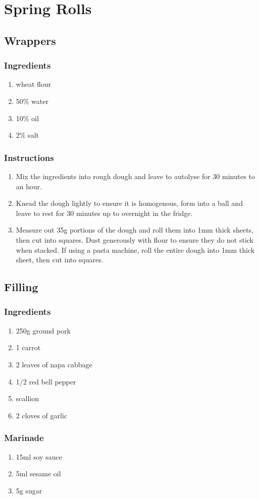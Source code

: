 \documentclass[11pt]{book}
\newcommand{\header}[1]{\subsubsection*{#1}}
\begin{document}
\section{Spring Rolls}
\subsection{Wrappers}

\header{Ingredients}
\begin{enumerate}
  \item wheat flour
  \item 50\% water
  \item 10\% oil
  \item 2\% salt
\end{enumerate}

\header{Instructions}
\begin{enumerate}
  \item Mix the ingredients into rough dough and leave to autolyse for 30
  minutes to an hour.
  \item Knead the dough lightly to ensure it is homogenous, form into a ball
  and leave to rest for 30 minutes up to overnight in the fridge.
  \item Measure out 35g portions of the dough and roll them into 1mm thick
  sheets, then cut into squares. Dust generously with flour to ensure they do
  not stick when stacked. If using a pasta machine, roll the entire dough into
  1mm thick sheet, then cut into squares.
\end{enumerate}

\subsection{Filling}
\header{Ingredients}
\begin{enumerate}
  \item 250g ground pork
  \item 1 carrot
  \item 2 leaves of napa cabbage
  \item 1/2 red bell pepper
  \item scallion
  \item 2 cloves of garlic
\end{enumerate}

\header{Marinade}
\begin{enumerate}
  \item 15ml soy sauce
  \item 5ml sesame oil
  \item 5g sugar
\end{enumerate}
\end{document}

